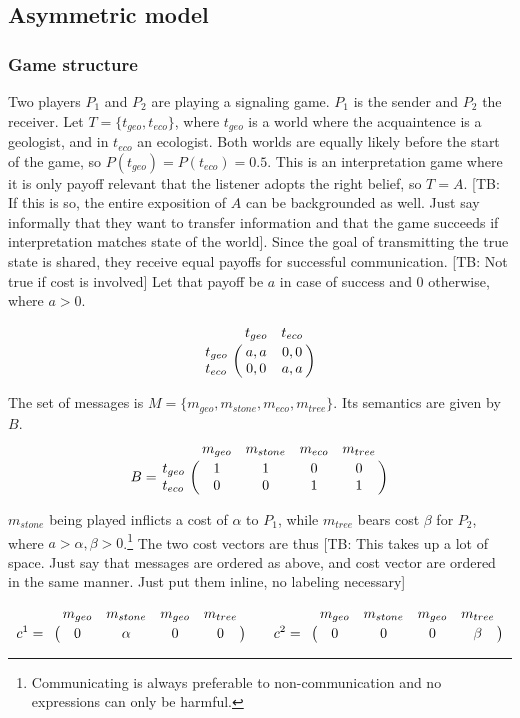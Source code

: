\documentclass[10pt]{article}
\newcommand{\tb}[1]{\textcolor[rgb]{.8,.33,.0}{[TB: #1]}}%
\begin{document}
\subsection{Asymmetric model}
\subsubsection{Game structure}
Two players $P_1$ and $P_2$ are playing a signaling game. $P_1$ is the sender and $P_2$ the receiver.
Let $T=\{t_{geo}, t_{eco}\}$, where $t_{geo}$ is a world where the acquaintence is a geologist, and in $t_{eco}$ an ecologist. Both worlds are equally likely before the start of the game, so $P(t_{geo})=P(t_{eco})=0.5$. This is an interpretation game where it is only payoff relevant that the listener adopts the right belief, so $T=A$. \tb{If this is so, the entire exposition of $A$ can be backgrounded as well. Just say informally that they want to transfer information and that the game succeeds if interpretation matches state of the world}. Since the goal of transmitting the true state is shared, they receive equal payoffs for successful communication. \tb{Not true if cost is involved} Let that payoff be $a$ in case of success and 0 otherwise, where $a>0$.

\begin{equation*}
\bordermatrix{
      & t_{geo} & t_{eco}    \cr
  t_{geo} & a,a & 0,0  \cr
  t_{eco} & 0,0 & a,a
}
\end{equation*}

The set of messages is $M=\{m_{geo}, m_{stone}, m_{eco}, m_{tree}\}$. Its semantics are given by $B$.
 \begin{equation*}
 B =
 \bordermatrix{
            & m_{geo} & m_{stone} & m_{eco} & m_{tree}    \cr
   t_{geo}  &       1 &         1 & 0       & 0 \cr
   t_{eco}  &       0 &         0 & 1       & 1
 }
 \end{equation*}

$m_{stone}$ being played inflicts a cost of $\alpha$ to $P_1$, while $m_{tree}$ bears cost $\beta$ for $P_2$, where $a>\alpha,\beta>0$.\footnote{Communicating is always preferable to non-communication and no expressions can only be harmful.} The two cost vectors are thus \tb{This takes up a lot of space. Just say that messages are ordered as above, and cost vector are ordered in the same manner. Just put them inline, no labeling necessary}

  \begin{equation*}
  c^1 =
  \bordermatrix{
             & m_{geo} & m_{stone} & m_{geo} & m_{tree}    \cr
             &       0 &         \alpha & 0       & 0
  }\qquad
  c^2 =
    \bordermatrix{
               & m_{geo} & m_{stone} & m_{geo} & m_{tree}    \cr
               &       0 &         0 & 0       & \beta
    }
  \end{equation*}
\end{document}
